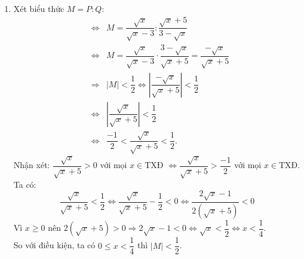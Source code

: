 \begin{bt}
{\begin{enumerate}
			Vậy $x = \dfrac{81}{4}$ thì $ P = 3 $
			\item Xét biểu thức $ M = P:Q $:
			\begin{eqnarray*}
				& \Leftrightarrow & M = \dfrac{\sqrt x }{\sqrt x  - 3}:\dfrac{\sqrt x  + 5}{3 - \sqrt x } \\
				& \Leftrightarrow & M = \dfrac{\sqrt x }{\sqrt x  - 3} \cdot \dfrac{3 - \sqrt x }{\sqrt x  + 5} = \dfrac{-\sqrt x }{\sqrt x  + 5} \\
				& \Rightarrow & \left| M \right| < \dfrac{1}{2} \Leftrightarrow \left| {\dfrac{{ - \sqrt x }}{{\sqrt x  + 5}}} \right| < \dfrac{1}{2} \\
				& \Leftrightarrow & \left| {\dfrac{{\sqrt x }}{{\sqrt x  + 5}}} \right| < \dfrac{1}{2} \\
				& \Leftrightarrow & \dfrac{ - 1}{2} < \dfrac{\sqrt x }{\sqrt x  + 5} < \dfrac{1}{2} .
			\end{eqnarray*}
			Nhận xét: $ \dfrac{\sqrt x }{\sqrt x  + 5} > 0 $ với mọi $x \in \text{TXĐ}$ $ \Leftrightarrow \dfrac{\sqrt x }{\sqrt x  + 5} >\dfrac{{ - 1}}{2} $ với mọi $x \in \text{TXĐ}$.\\
			Ta có:
			$$ \dfrac{\sqrt x }{\sqrt x  + 5} < \dfrac{1}{2} \Leftrightarrow \dfrac{\sqrt x }{\sqrt x  + 5} - \dfrac{1}{2} < 0 \Leftrightarrow \dfrac{2\sqrt x  - 1}{2\left( \sqrt x  + 5 \right)} < 0 $$
			Vì $x \ge 0$ nên $2\left( \sqrt x  + 5 \right) > 0 \Rightarrow 2\sqrt x  - 1 < 0 \Leftrightarrow \sqrt x  < \dfrac{1}{2} \Leftrightarrow x < \dfrac{1}{4}$.\\
			So với điều kiện, ta có $0 \le x < \dfrac{1}{4}$ thì $\left| M \right| < \dfrac{1}{2}$.
		\end{enumerate}	
	}
\end{bt}

